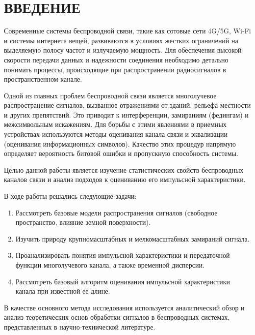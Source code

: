 \section*{ВВЕДЕНИЕ}

Современные системы беспроводной связи, такие как сотовые сети 4G/5G, Wi-Fi и системы интернета вещей, развиваются в условиях жестких ограничений на выделяемую полосу частот и излучаемую мощность. Для обеспечения высокой скорости передачи данных и надежности соединения необходимо детально понимать процессы, происходящие при распространении радиосигналов в пространственном канале.

Одной из главных проблем беспроводной связи является многолучевое распространение сигналов, вызванное отражениями от зданий, рельефа местности и других препятствий. Это приводит к интерференции, замираниям (федингам) и межсимвольным искажениям. Для борьбы с этими явлениями в приемных устройствах используются методы оценивания канала связи и эквализации (оценивания информационных символов). Качество этих процедур напрямую определяет вероятность битовой ошибки и пропускную способность системы.

Целью данной работы является изучение статистических свойств беспроводных каналов связи и анализ подходов к оцениванию его импульсной характеристики.

В ходе работы решались следующие задачи:
\begin{enumerate}
    \item Рассмотреть базовые модели распространения сигналов (свободное пространство, влияние земной поверхности).
    \item Изучить природу крупномасштабных и мелкомасштабных замираний сигнала.
    \item Проанализировать понятия импульсной характеристики и передаточной функции многолучевого канала, а также временной дисперсии.
    \item Рассмотреть базовый алгоритм оценивания импульсной характеристики канала при известной ее длине.
\end{enumerate}

В качестве основного метода исследования используется аналитический обзор и анализ теоретических основ обработки сигналов в беспроводных системах, представленных в научно-технической литературе.